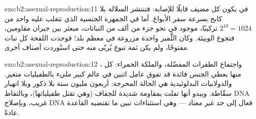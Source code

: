 \begin{solution}{exo:b2:asexual-reproduction:11}
في  يكون كل مضيف قابلًا للإصابة: فتنتشر السلالة
بلا كابح بسرعة سفر الأبواغ. أما في الجمهرة الجنسية
 الذي تتغلب عليه واحد من $2^{10} = 1024$ تركيبًا،
موجود في نحو جزء من ألف من النباتات، مبعثر بين جيران
مقاومين، فتجوع الوبيئة. وكان اللَّمبر  واحدة
مزروعة في معظم بلد؛ فوجدت اللفحة كل نبات
مفتوحًا، ولم يكن ثمة تنوع يُربّى منه حتى استُوردت أصناف أخرى.
\end{solution}

\begin{solution}{exo:b2:asexual-reproduction:12}
، واجتماع الطفرات المفضّلة، والملكة الحمراء: كل
منها يعطي الجنس فائدة قد تفوق عامل اثنين في عالم كبير
مليء بالطفيليات متغير. والدولابيات البدلوئيدية هي الحالة
المحرجة: أربعون مليون سنة بلا ذكور وبلا انهيار سقّاطة.
ويبدو أنها تفلت بمقاومة شديدة للجفاف
(وهي تقتل طفيلياتها)، وبالتقاط DNA غريب، وبإصلاح
DNA فعال إلى حد غير معتاد --- وهي استثناءات تبين ما تقتضيه
القاعدة عادةً.
\end{solution}

